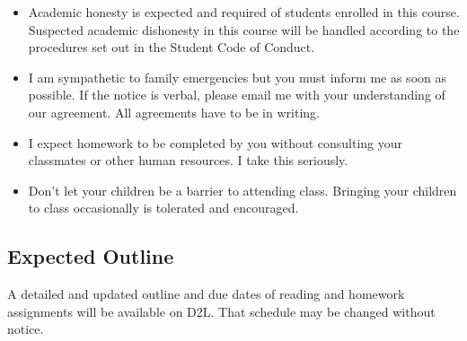 \documentclass[letterpaper,10pt]{article}
\begin{document}
\begin{itemize}
\item Academic honesty is expected and required of students enrolled
  in this course.  Suspected academic dishonesty in this course will
  be handled according to the procedures set out in the Student Code
  of Conduct.

\item I am sympathetic to family emergencies but you must inform me as
  soon as possible. If the notice is verbal, please email me with your
  understanding of our agreement. All agreements have to be in
  writing.
  
\item I expect homework to be completed by you without consulting your classmates or other human resources.  I take this seriously.  

\item Don't let your children be a barrier to attending class. Bringing your children to class occasionally is tolerated and encouraged.


\end{itemize}

 
\subsection{Expected Outline}
A detailed and updated outline and due dates of reading and homework assignments will be available on D2L.  That schedule may be changed without notice.
\end{document}
